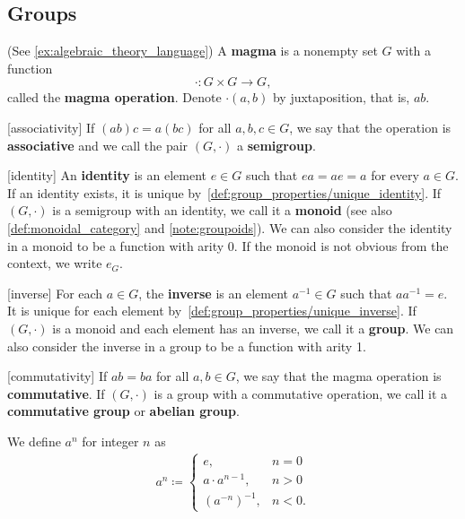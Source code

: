 \subsection{Groups}\label{subsec:groups}

\begin{definition}\label{def:group}(See \cref{ex:algebraic_theory_language})
  A \textbf{magma} is a nonempty set \( G \) with a function 
  \begin{equation*}
    \cdot: G \times G \to G,
  \end{equation*}
  called the \textbf{magma operation}. Denote \( \cdot(a, b) \) by juxtaposition, that is, \( ab \).

  \begin{description}
    [associativity] If \( (ab)c = a(bc) \) for all \( a, b, c \in G \), we say that the operation is \textbf{associative} and we call the pair \( (G, \cdot) \) a \textbf{semigroup}.

    [identity] An \textbf{identity} is an element \( e \in G \) such that \( ea = ae = a \) for every \( a \in G \). If an identity exists, it is unique by~\cref{def:group_properties/unique_identity}. If \( (G, \cdot) \) is a semigroup with an identity, we call it a \textbf{monoid} (see also \cref{def:monoidal_category} and \cref{note:groupoids}). We can also consider the identity in a monoid to be a function with arity 0. If the monoid is not obvious from the context, we write \( e_G \).

    [inverse] For each \( a \in G \), the \textbf{inverse} is an element \( a^{-1} \in G \) such that \( aa^{-1} = e \). It is unique for each element by~\cref{def:group_properties/unique_inverse}. If \( (G, \cdot) \) is a monoid and each element has an inverse, we call it a \textbf{group}. We can also consider the inverse in a group to be a function with arity 1.

    [commutativity] If \( ab = ba \) for all \( a, b \in G \), we say that the magma operation is \textbf{commutative}. If \( (G, \cdot) \) is a group with a commutative operation, we call it a \textbf{commutative group} or \textbf{abelian group}.
  \end{description}

  We define \( a^n \) for integer \( n \) as
  \begin{align*}
    a^n \coloneqq \begin{cases}
      e, &n = 0 \\
      a \cdot a^{n-1}, &n > 0 \\
      (a^{-n})^{-1}, &n < 0.
    \end{cases}
  \end{align*}


\end{definition}
